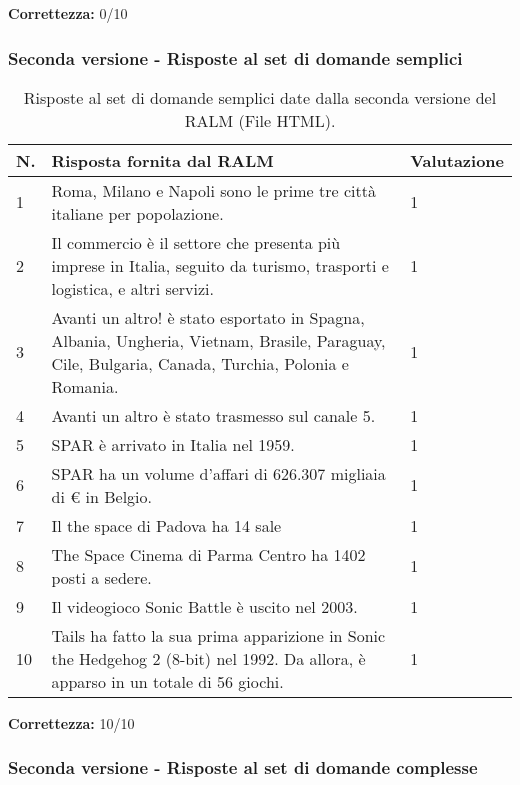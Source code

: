 \textbf{Correttezza:} 0/10

\subsubsection{Seconda versione - Risposte al set di domande semplici}

\begin{table}[H]
    \centering
    \begin{tabular}{|p{0.5cm} |p{6cm} |p{2cm}|}
        \hline
        \textbf{N}. & \textbf{Risposta fornita dal RALM} & \textbf{Valutazione} \\
        \hline
        1 & Roma, Milano e Napoli sono le prime tre città italiane per popolazione. & 1 \\
        \hline
        2 & Il commercio è il settore che presenta più imprese in Italia, seguito da turismo, trasporti e logistica, e altri servizi. & 1 \\
        \hline
        3 & Avanti un altro! è stato esportato in Spagna, Albania, Ungheria, Vietnam, Brasile, Paraguay, Cile, Bulgaria, Canada, Turchia, Polonia e Romania. & 1 \\
        \hline
        4 & Avanti un altro è stato trasmesso sul canale 5. & 1 \\
        \hline
        5 & SPAR è arrivato in Italia nel 1959. & 1 \\
        \hline
        6 & SPAR ha un volume d'affari di 626.307 migliaia di € in Belgio. & 1 \\
        \hline
        7 & Il the space di Padova ha 14 sale & 1 \\
        \hline
        8 & The Space Cinema di Parma Centro ha 1402 posti a sedere. & 1 \\
        \hline
        9 & Il videogioco Sonic Battle è uscito nel 2003. & 1 \\
        \hline
        10 & Tails ha fatto la sua prima apparizione in Sonic the Hedgehog 2 (8-bit) nel 1992. Da allora, è apparso in un totale di 56 giochi. & 1 \\
        \hline
    \end{tabular}
    \caption{Risposte al set di domande semplici date dalla seconda versione del RALM (File HTML).}
\end{table}

\textbf{Correttezza:} 10/10

\subsubsection{Seconda versione - Risposte al set di domande complesse}

